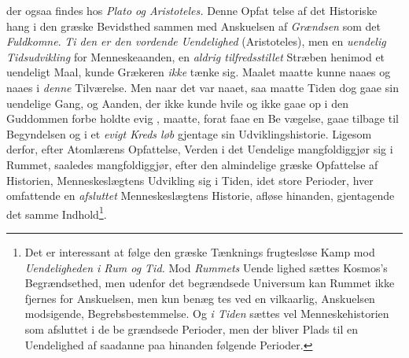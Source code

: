 der ogsaa findes hos \emph{Plato og Aristoteles.} Denne Opfat\-%
telse af det Historiske hang i den græske Bevidsthed sammen
med Anskuelsen af \emph{Grændsen} som det \emph{Fuldkomne}. \emph{Ti\-%
den er den vordende Uendelighed} (Aristoteles), men en
\emph{uendelig Tidsudvikling} for Menneskeaanden, en \emph{aldrig
tilfredsstillet} Stræben henimod et uendeligt Maal, kunde
Grækeren \emph{ikke} tænke sig. Maalet maatte kunne naaes og
naaes i \emph{denne} Tilværelse. Men naar det var naaet, saa
maatte Tiden dog gaae sin uendelige Gang, og Aanden, der
ikke kunde hvile og ikke gaae op i den Guddommen forbe\-%
holdte evig , maatte, forat faae en Be\-%
vægelse, gaae tilbage til Begyndelsen og i et \emph{evigt Kreds\-%
løb} gjentage sin Udviklingshistorie. Ligesom derfor, efter
Atomlærens Opfattelse, Verden i det Uendelige mangfoldiggjør
sig i Rummet, saaledes mangfoldiggjør, efter den almindelige
græske Opfattelse af Historien, Menneskeslægtens Udvikling
sig i Tiden, idet store Perioder, hver omfattende en \emph{afsluttet}
Menneskeslægtens Historie, afløse hinanden, gjentagende det
samme Indhold\footnote{Det er interessant at følge den græske Tænknings frugtesløse Kamp
mod \emph{Uendeligheden i Rum og Tid.} Mod \emph{Rummets} Uende\-%
lighed sættes Kosmos's Begrændsethed, men udenfor det begrændsede
Universum kan Rummet ikke fjernes for Anskuelsen, men kun benæg\-%
tes ved en vilkaarlig, Anskuelsen modsigende, Begrebsbestemmelse.
Og \emph{i Tiden} sættes vel Menneskehistorien som afsluttet i de be\-%
grændsede Perioder, men der bliver Plads til en Uendelighed af
saadanne paa hinanden følgende Perioder.}.

\divrule

